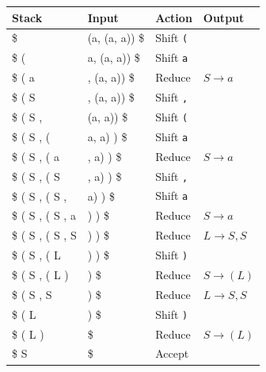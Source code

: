 \begin{table}[htbp]
	\centering
	\begin{tabular}{|l|l|l|l|}
	\hline
	Stack & Input & Action & Output \\\hline
	\$ & (a, (a, a)) \$ & Shift \texttt{(} & \\
	\$ ( & a, (a, a)) \$ & Shift \texttt{a} & \\
	\$ ( a & , (a, a)) \$ & Reduce & $S \to a$ \\
	\$ ( S & , (a, a)) \$ & Shift \texttt{,} & \\
	\$ ( S , & (a, a)) \$ & Shift \texttt{(} & \\
	\$ ( S , ( & a, a) ) \$ & Shift \texttt{a} & \\
	\$ ( S , ( a & , a) ) \$ & Reduce & $S \to a$ \\
	\$ ( S , ( S & , a) ) \$ & Shift \texttt{,} & \\
	\$ ( S , ( S , & a) ) \$ & Shift \texttt{a} & \\
	\$ ( S , ( S , a & ) ) \$ & Reduce & $S \to a$ \\
	\$ ( S , ( S , S & ) ) \$ & Reduce & $L \to S, S$ \\
	\$ ( S , ( L & ) ) \$ & Shift \texttt{)} & \\
	\$ ( S , ( L ) & ) \$ & Reduce & $S \to (L)$ \\
	\$ ( S , S & ) \$ & Reduce & $L \to S, S$ \\
	\$ ( L & ) \$ & Shift \texttt{)} & \\
	\$ ( L ) & \$ & Reduce & $S \to (L)$ \\
	\$ S & \$ & Accept & \\\hline
	\end{tabular}
\end{table}

